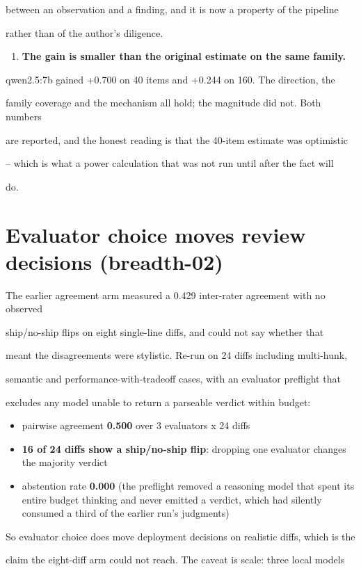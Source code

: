 \documentclass[11pt]{article}
\begin{document}
between an observation and a finding, and it is now a property of the pipeline

rather than of the author's diligence.

\begin{enumerate}\item {\bf The gain is smaller than the original estimate on the same family.}
\end{enumerate}
qwen2.5:7b gained +0.700 on 40 items and +0.244 on 160. The direction, the

family coverage and the mechanism all hold; the magnitude did not. Both numbers

are reported, and the honest reading is that the 40-item estimate was optimistic

-- which is what a power calculation that was not run until after the fact will

do.


\section*{Evaluator choice moves review decisions (breadth-02)}

The earlier agreement arm measured a 0.429 inter-rater agreement with no observed

ship/no-ship flips on eight single-line diffs, and could not say whether that

meant the disagreements were stylistic. Re-run on 24 diffs including multi-hunk,

semantic and performance-with-tradeoff cases, with an evaluator preflight that

excludes any model unable to return a parseable verdict within budget:


\begin{itemize}
\item pairwise agreement {\bf 0.500} over 3 evaluators x 24 diffs
\item {\bf 16 of 24 diffs show a ship/no-ship flip}: dropping one evaluator changes the majority verdict
\item abstention rate {\bf 0.000} (the preflight removed a reasoning model that spent its entire budget thinking and never emitted a verdict, which had silently consumed a third of the earlier run's judgments)
\end{itemize}

So evaluator choice does move deployment decisions on realistic diffs, which is the

claim the eight-diff arm could not reach. The caveat is scale: three local models
\end{document}
